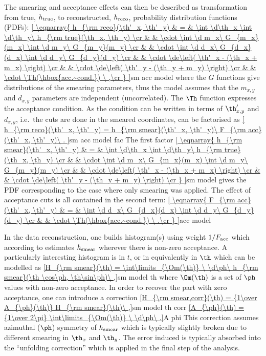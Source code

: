 The smearing and acceptance effects can then be described as transformation from true, $h_{\rm true}$, to reconstructed, $h_{\rm reco}$, probability distribution functions (PDFs):
\eqref{
\eqnarray{
	h_{\rm reco}(\th'_x, \th'_y) & = & \int \d\th_x \int \d\th_y\ h_{\rm true}(\th_x, \th_y) \cr
								 &  & \cdot \int \d m_x\ G_{m_x}(m_x) \int \d m_y\ G_{m_y}(m_y) \cr
								 &  & \cdot \int \d d_x\ G_{d_x}(d_x) \int \d d_y\ G_{d_y}(d_y) \cr
								 &  & \cdot \de\left( \th'_x - (\th_x + m_x) \right) \cr
								 &  & \cdot \de\left( \th'_y - (\th_y + m_y) \right) \cr
								 &  & \cdot \Th(\hbox{acc.~cond.}) \ ,\cr
}
}{sm acc model}
where the $G$ functions give distributions of the smearing parameters, thus the model assumes that the $m_{x,y}$ and $d_{x,y}$ parameters are independent (uncorrelated). The $\Th$ function expresses the acceptance condition. As the condition can be written in terms of $\th'_{x,y}$ and $d_{x,y}$, i.e.~the cuts are done in the smeared coordinates,  can be factorised as
\eqref{
	h_{\rm reco}(\th'_x, \th'_y) = h_{\rm smear}(\th'_x, \th'_y)\ F_{\rm acc}(\th'_x, \th'_y)\ .
}{sm acc model fac}
The first factor
\eqref{
\eqnarray{
	h_{\rm smear}(\th'_x, \th'_y) & = & \int \d\th_x \int \d\th_y\ h_{\rm true}(\th_x, \th_y) \cr
								 &  & \cdot \int \d m_x\ G_{m_x}(m_x) \int \d m_y\ G_{m_y}(m_y) \cr
								 &  & \cdot \de\left( \th'_x - (\th_x + m_x) \right) \cr
								 &  & \cdot \de\left( \th'_y - (\th_y + m_y) \right) \cr
}
}{sm model}
gives the PDF corresponding to the case where only smearing was applied. The effect of acceptance cuts is all contained in the second term:
\eqref{
\eqnarray{
	F_{\rm acc}(\th'_x, \th'_y) & = & \int \d d_x\ G_{d_x}(d_x) \int \d d_y\ G_{d_y}(d_y) \cr
								 &  & \cdot \Th(\hbox{acc.~cond.}) \ .\cr
}
}{acc model}

In the data reconstruction, one builds histogram(s) using weight $1 / F_{\rm acc}$ which according to  estimates $h_{\rm smear}$ wherever there is non-zero acceptance. A particularly interesting histogram is in $t$, or in equivalently in $\th$ which can be modelled as
\eqref{H_{\rm smear}(\th) = \int\limits_{\Om(\th)} \ \d\ph\ h_{\rm smear}(\th \cos\ph, \th\sin\ph)\ ,}{sm model th}
where $\Om(\th)$ is a set of $\ph$ values with non-zero acceptance. In order to recover the part with zero acceptance, one can introduce a correction
\eqref{H_{\rm smear,corr}(\th) = {1\over A_{\ph}(\th)} H_{\rm smear}(\th)\ ,}{sm model th corr}
\eqref{A_{\ph}(\th) = {1\over 2\pi} \int\limits_{\Om(\th)} \ \d\ph\ .}{A phi}
This correction assumes azimuthal ($\ph$) symmetry of $h_{\rm smear}$ which is typically slightly broken due to different smearing in $\th_x$ and $\th_y$. The error induced is typically absorbed into the ``unfolding correction'' which is applied in the final step of the analysis.

